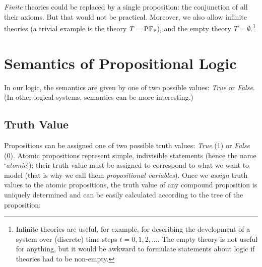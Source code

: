 \emph{Finite} theories could be replaced by a single proposition: the conjunction of all their axioms. But that would not be practical. Moreover, we also allow infinite theories (a trivial example is the theory $T = \operatorname{PF}_\mathbb{P}$), and the empty theory $T = \emptyset$.\footnote{Infinite theories are useful, for example, for describing the development of a system over (discrete) time steps $t = 0, 1, 2, \dots$. The empty theory is not useful for anything, but it would be awkward to formulate statements about logic if theories had to be non-empty.}


\section{Semantics of Propositional Logic}

In our logic, the semantics are given by one of two possible values: \emph{True} or \emph{False}. (In other logical systems, semantics can be more interesting.)


\subsection{Truth Value}

Propositions can be assigned one of two possible truth values: \emph{True} (1) or \emph{False} (0). Atomic propositions represent simple, indivisible statements (hence the name `\emph{atomic}'); their truth value must be assigned to correspond to what we want to model (that is why we call them \emph{propositional variables}). Once we \emph{assign} truth values to the atomic propositions, the truth value of any compound proposition is uniquely determined and can be easily calculated according to the tree of the proposition:

